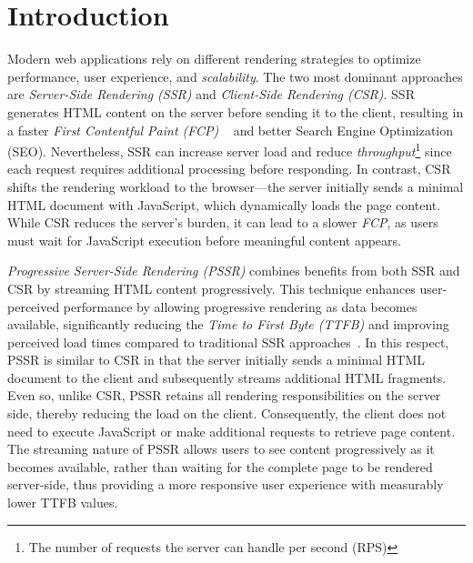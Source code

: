 \section{Introduction}


Modern web applications rely on different rendering strategies to optimize
performance, user experience, and \textit{scalability}. The two most dominant
approaches are \textit{Server-Side Rendering (SSR)} and \textit{Client-Side
    Rendering (CSR)}. SSR generates HTML content on the server before sending it to
the client, resulting in a faster \textit{First Contentful Paint (FCP)}
~\cite{Edgar2024-FCP} and better Search Engine Optimization (SEO). Nevertheless, SSR
can increase server load and reduce \textit{throughput}\footnote{The number of
    requests the server can handle per second (RPS)} since each request requires
additional processing before responding. In contrast, CSR shifts the rendering
workload to the browser—the server initially sends a minimal HTML document with
JavaScript, which dynamically loads the page content. While CSR reduces the
server’s burden, it can lead to a slower \textit{FCP}, as users must wait for
JavaScript execution before meaningful content appears.

\textit{Progressive Server-Side Rendering (PSSR)} combines benefits from both SSR and CSR
by streaming HTML content progressively. This technique enhances user-perceived performance by
allowing progressive rendering as data becomes available, significantly reducing the
\textit{Time to First Byte (TTFB)} and improving perceived load times compared to traditional
SSR approaches~\cite{wise2024pssr}. In this respect,
PSSR is similar to CSR in that the server initially sends a minimal HTML
document to the client and subsequently streams additional HTML fragments.
Even so, unlike CSR, PSSR retains all rendering responsibilities on the server side,
thereby reducing the load on the client. Consequently, the client does
not need to execute JavaScript or make additional requests to retrieve page content.
The streaming nature of PSSR allows users to see content progressively as it becomes
available, rather than waiting for the complete page to be rendered server-side,
thus providing a more responsive user experience with measurably lower TTFB values.

